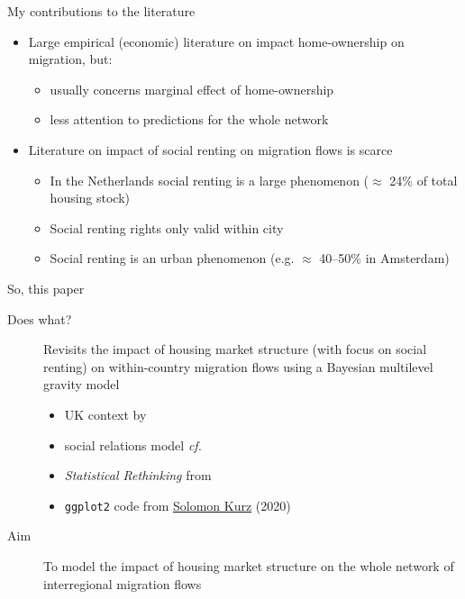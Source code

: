 \documentclass{beamer}
\begin{document}
\begin{frame}{My contributions to the literature}
  \begin{itemize}
  \item Large empirical (economic) literature on impact home-ownership on migration, but:
    \begin{itemize}
    \item usually concerns \alert{marginal} effect of home-ownership
    \item less attention to \alert{predictions} for the whole network\newline
    \end{itemize}
  \item Literature on impact of social renting on migration flows is
    scarce \footnotesize{\citep{de2009homeownership} }
	\begin{itemize}
        \item In the Netherlands social renting is a large phenomenon
          ($\approx$ 24\% of total housing stock)
        \item Social renting rights only valid \alert{within} city
        \item Social renting is an \alert{urban} phenomenon (e.g. $\approx$
          40--50\% in Amsterdam) 
        \end{itemize}
\end{itemize}
\end{frame}

\begin{frame}{So, this paper}
  \begin{description}
  \item[Does what?] \alert{Revisits} the impact of housing market
    structure (with focus on social renting) on within-country
    migration flows using a Bayesian multilevel gravity model
    \begin{footnotesize}
	\begin{itemize}
	  \item \footnotesize UK context by \citet{congdon2010random}
	  \item \footnotesize social relations model \emph{cf.}
		\citet{koster2014food}
		\item \footnotesize \emph{Statistical Rethinking} from \citet{mcelreath2020statistical}
		\item \footnotesize \texttt{ggplot2} code from \href{https://bookdown.org/content/4857/}{Solomon Kurz} (2020) \newline
	\end{itemize}
  \end{footnotesize}
	\item[Aim] To \alert{model} the impact of housing market structure on the whole \alert{network} of interregional migration flows
  \end{description}
\end{frame}
\end{document}

